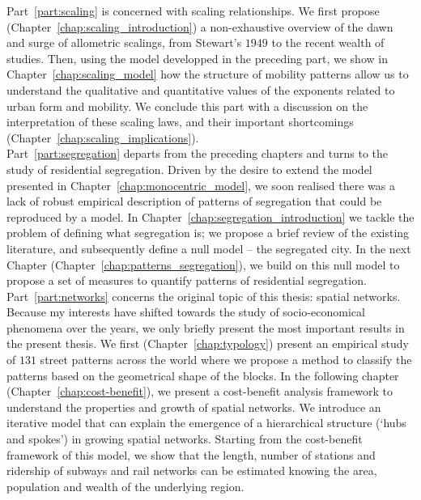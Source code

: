 Part~\ref{part:scaling} is concerned with scaling relationships. We first propose
(Chapter~\ref{chap:scaling_introduction}) a non-exhaustive overview of the dawn
and surge of allometric scalings, from Stewart's $1949$ to the recent wealth of
studies. Then, using the model developped in the preceding part, we show in
Chapter~\ref{chap:scaling_model} how the structure of mobility patterns allow us
to understand the qualitative and quantitative values of the exponents related
to urban form and mobility. We conclude this part with a discussion on the
interpretation of these scaling laws, and their important shortcomings
(Chapter~\ref{chap:scaling_implications}).\\

Part~\ref{part:segregation} departs from the preceding chapters and turns to the
study of residential segregation. Driven by the desire to extend the model
presented in Chapter~\ref{chap:monocentric_model}, we soon realised there was a
lack of robust empirical description of patterns of segregation that could be
reproduced by a model. In Chapter~\ref{chap:segregation_introduction} we tackle
the problem of defining what segregation is; we propose a brief review of the
existing literature, and subsequently define a null model -- the segregated
city. In the next Chapter (Chapter~\ref{chap:patterns_segregation}), we build on
this null model to propose a set of measures to quantify patterns of residential
segregation.\\

Part~\ref{part:networks} concerns the original topic of this thesis: spatial
networks. Because my interests have shifted towards the study of
socio-economical phenomena over the years, we only briefly present the most
important results in the present thesis. We first (Chapter~\ref{chap:typology}) present an empirical
study of $131$ street patterns across the world where we propose a method to
classify the patterns based on the geometrical shape of the blocks. In the
following chapter (Chapter~\ref{chap:cost-benefit}), we present a cost-benefit
analysis framework to understand the properties and growth of spatial networks.
We introduce an iterative model that can explain the emergence of a hierarchical
structure (`hubs and spokes') in growing spatial networks. Starting from the
cost-benefit framework of this model, we show that the length, number of
stations and ridership of subways and rail networks can be estimated knowing the
area, population and wealth of the underlying region.\\

